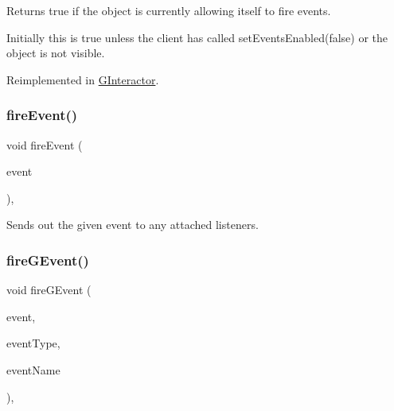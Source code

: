 Returns true if the object is currently allowing itself to fire events. 

Initially this is true unless the client has called {\ttfamily set\+Events\+Enabled(false)} or the object is not visible. 

Reimplemented in \mbox{\hyperlink{classGInteractor_ac05ba5b92e2e5146d416fe7f842a0969}{G\+Interactor}}.

\mbox{\label{classGObservable_a63e5e5a6227c59c928493b11aceb0f67}} 
\subsubsection{\texorpdfstring{fire\+Event()}{fireEvent()}}
{\footnotesize\ttfamily void fire\+Event (\begin{DoxyParamCaption}\item[{\mbox{\hyperlink{classGEvent}{G\+Event}} \&}]{event }\end{DoxyParamCaption})\hspace{0.3cm}{\ttfamily [protected]}, {\ttfamily [virtual]}}



Sends out the given event to any attached listeners. 

\mbox{\label{classGObservable_ab3983ea07337b52020a29cc00c653d8d}} 
\subsubsection{\texorpdfstring{fire\+G\+Event()}{fireGEvent()}\hspace{0.1cm}{\footnotesize\ttfamily [1/8]}}
{\footnotesize\ttfamily void fire\+G\+Event (\begin{DoxyParamCaption}\item[{Q\+Event $\ast$}]{event,  }\item[{Event\+Type}]{event\+Type,  }\item[{const std\+::string \&}]{event\+Name }\end{DoxyParamCaption})\hspace{0.3cm}{\ttfamily [protected]}, {\ttfamily [virtual]}}



